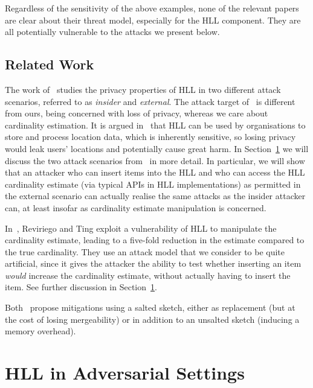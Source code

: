 \documentclass[11pt]{article}
\begin{document}
Regardless of the sensitivity of the above examples, none of the relevant papers are clear about their threat model, especially for the HLL component.  They are all potentially vulnerable to the attacks we present below.

\subsection{Related Work}

The work of~\cite{cardestprivacy} studies the privacy properties of HLL in two different attack scenarios, referred to as \emph{insider} and \emph{external}. The attack target of~\cite{cardestprivacy} is different from ours, being concerned with loss of privacy, whereas we care about cardinality estimation. It is argued in~\cite{cardestprivacy} that HLL can be used by organisations to store and process location data, which is inherently sensitive, so losing privacy would leak users' locations and potentially cause great harm. In Section~\ref{sec:attacks} we will discuss the two attack scenarios from~\cite{cardestprivacy} in more detail. In particular, we will show that an attacker who can insert items into the HLL and who can access the HLL cardinality estimate (via typical APIs in HLL implementations) as permitted in the external scenario can actually realise the same attacks as the insider attacker can, at least insofar as cardinality estimate manipulation is concerned.

In~\cite{hllvuln}, Reviriego and Ting exploit a vulnerability of HLL to manipulate the cardinality estimate, leading to a five-fold reduction in the estimate compared to the true cardinality. They use an attack model that we consider to be quite artificial, since it gives the attacker the ability to test whether inserting an item \emph{would} increase the cardinality estimate, without actually having to insert the item. See further discussion in Section~\ref{sec:attacks}.

Both~\cite{cardestprivacy,hllvuln} propose mitigations using a salted sketch, either as replacement (but at the cost of losing mergeability) or in addition to an unsalted sketch (inducing a memory overhead).

\section{HLL in Adversarial Settings}\label{sec:attacks}
\end{document}
